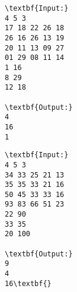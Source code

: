 \begin{verbatim}
\textbf{Input:}
4 5 3
17 18 22 26 18
26 16 26 13 19
20 11 13 09 27
01 29 08 11 14
1 16
8 29
12 18

\textbf{Output:}
4
16
1
\end{verbatim}
\begin{verbatim}
\textbf{Input:}
4 5 3
34 33 25 21 13
35 35 33 21 16
50 45 33 33 16
93 83 66 51 23
22 90
33 35
20 100

\textbf{Output:}
9
4
16\textbf{}\end{verbatim}